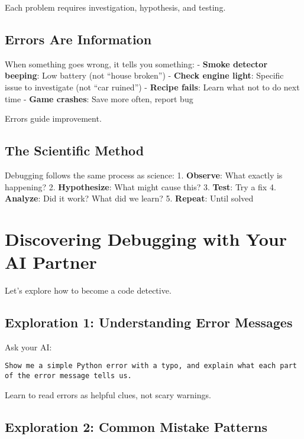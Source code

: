 \documentclass[
  letterpaper,
  DIV=11,
  numbers=noendperiod,
  oneside]{scrreprt}
\begin{document}
Each problem requires investigation, hypothesis, and testing.

\subsection{Errors Are Information}\label{errors-are-information}

When something goes wrong, it tells you something: - \textbf{Smoke
detector beeping}: Low battery (not ``house broken'') - \textbf{Check
engine light}: Specific issue to investigate (not ``car ruined'') -
\textbf{Recipe fails}: Learn what not to do next time - \textbf{Game
crashes}: Save more often, report bug

Errors guide improvement.

\subsection{The Scientific Method}\label{the-scientific-method}

Debugging follows the same process as science: 1. \textbf{Observe}: What
exactly is happening? 2. \textbf{Hypothesize}: What might cause this? 3.
\textbf{Test}: Try a fix 4. \textbf{Analyze}: Did it work? What did we
learn? 5. \textbf{Repeat}: Until solved

\section{Discovering Debugging with Your AI
Partner}\label{discovering-debugging-with-your-ai-partner}

Let's explore how to become a code detective.

\subsection{Exploration 1: Understanding Error
Messages}\label{exploration-1-understanding-error-messages}

Ask your AI:

\begin{verbatim}
Show me a simple Python error with a typo, and explain what each part 
of the error message tells us.
\end{verbatim}

Learn to read errors as helpful clues, not scary warnings.

\subsection{Exploration 2: Common Mistake
Patterns}\label{exploration-2-common-mistake-patterns}
\end{document}
